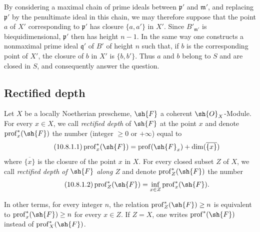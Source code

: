 \begin{env}[10.7.3]
By considering a maximal chain of prime ideals between $\mathfrak{p}'$ and $\mathfrak{m}'$, and replacing $\mathfrak{p}'$ by the penultimate ideal in this chain, we may therefore suppose that the point $a$ of $X'$ corresponding to $\mathfrak{p}'$ has closure $\{a,a'\}$ in $X'$.
Since $B'_{\mathfrak{m}'}$ is biequidimensional, $\mathfrak{p}'$ then has height $n-1$.
In the same way one constructs a nonmaximal prime ideal $\mathfrak{q}'$ of $B'$ of height $n$ such that, if $b$ is the corresponding point of $X'$, the closure of $b$ in $X'$ is $\{b,b'\}$.
Thus $a$ and $b$ belong to $S$ and are closed in $S$, and consequently answer the question.
\end{env}

\subsection{Rectified depth}
\label{subsection:IV.10.8}

\begin{definition}[10.8.1]
\label{IV.10.8.1}
Let $X$ be a locally Noetherian prescheme, $\sh{F}$ a coherent $\sh{O}_X$-Module.
For every $x\in X$, we call \emph{rectified depth} of $\sh{F}$ at the point $x$ and denote $\operatorname{prof}^*_x(\sh{F})$ the number (integer $\geq 0$ or $+\infty$) equal to
\begin{equation}
\label{IV.10.8.1.1}
\tag{10.8.1.1}
\operatorname{prof}^*_x(\sh{F})=\operatorname{prof}(\sh{F}_x)+\dim(\overline{\{x\}})
\end{equation}
where $\overline{\{x\}}$ is the closure of the point $x$ in $X$.
For every closed subset $Z$ of $X$, we call \emph{rectified depth of $\sh{F}$ along $Z$} and denote $\operatorname{prof}^*_Z(\sh{F})$ the number
\begin{equation}
\label{IV.10.8.1.2}
\tag{10.8.1.2}
\operatorname{prof}^*_Z(\sh{F})=\inf_{x\in Z}\operatorname{prof}^*_x(\sh{F}).
\end{equation}
\end{definition}

In other terms, for every integer $n$, the relation $\operatorname{prof}^*_Z(\sh{F})\geq n$ is equivalent to $\operatorname{prof}^*_x(\sh{F})\geq n$ for every $x\in Z$.
If $Z=X$, one writes $\operatorname{prof}^*(\sh{F})$ instead of $\operatorname{prof}^*_X(\sh{F})$.


